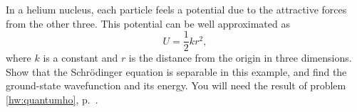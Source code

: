 In a helium nucleus, each particle feels a potential due to the attractive
forces from the other three. This potential can be well approximated as
\begin{equation*}
  U = \frac{1}{2}kr^2,
\end{equation*}
where $k$ is a constant and $r$ is the distance from the origin in three dimensions.
Show that the Schr\"odinger equation is separable in this example, and
find the ground-state wavefunction and its energy. You will need the result of problem
\ref{hw:quantumho}, p.~\pageref{hw:quantumho}.
